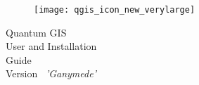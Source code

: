 \begin{titlepage}
\begin{center}

\begin{figure}[H]
\begin{center}
\texttt{[image: qgis\_icon\_new\_verylarge]} 
\end{center}
\end{figure}

\Huge{Quantum GIS}\\
\vspace{0.5cm}
\Large{User and Installation \\Guide} \\
\vspace{0.5cm}
\large{Version ~\CURRENT \textsl{'Ganymede'}}


\end{center}
\end{titlepage}
